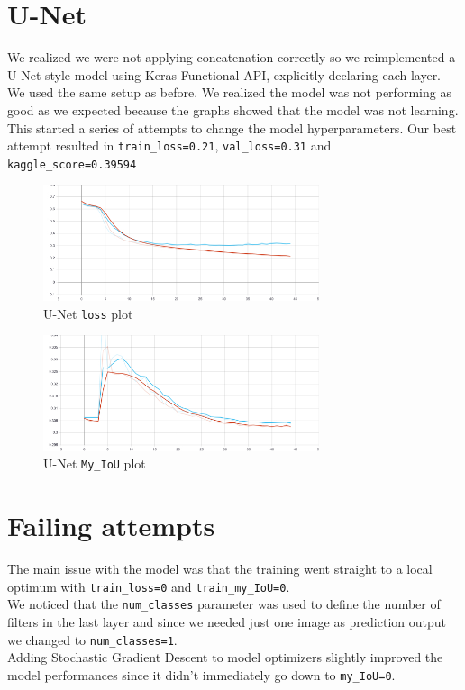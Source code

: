 \documentclass{article}
\begin{document}
	\section{U-Net}
	
		We realized we were not applying concatenation correctly so we reimplemented a U-Net style model using Keras Functional  API, explicitly declaring each layer. We used the same setup as before.  We realized the model was not performing as good as we expected because the graphs showed that the model was not learning.
		This started a series of attempts to change the model hyperparameters. 
		Our best attempt resulted in \texttt{train\_loss=0.21}, \texttt{val\_loss=0.31} and \texttt{kaggle\_score=0.39594} 
		
		\begin{figure}[H]
			\centering
			\includegraphics[height=3.4cm, keepaspectratio]{U-Net_conc_Dec07_14-23-41_epoch_loss.jpg}
			\caption{U-Net \texttt{loss} plot}
		\end{figure}
	
		\begin{figure}[H]
			\centering
			\includegraphics[height=3.4cm, keepaspectratio]{U-Net_conc_Dec07_14-23-41_epoch_my_IoU.jpg}
			\caption{U-Net \texttt{My\_IoU} plot}
		\end{figure}
			
	\section{Failing attempts}
		
		The main issue with the model was that the training went straight to a local optimum with \texttt{train\_loss=0} and \texttt{train\_my\_IoU=0}. \\
    	We noticed that the \texttt{num\_classes} parameter was used to define the number of filters in the last layer and since we needed just one image as prediction output we changed to \texttt{num\_classes=1}. \\
    	Adding Stochastic Gradient Descent to model optimizers slightly improved the model performances since it didn't immediately go down to \texttt{my\_IoU=0}.
	
\end{document}

